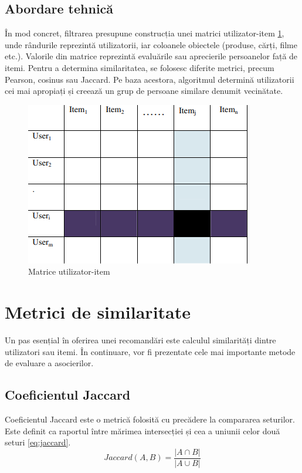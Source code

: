 \subsection{Abordare tehnică}
\label{subsec:ch3sec2sub1}
În mod concret, filtrarea presupune construcția unei matrici utilizator-item \ref{FigUserItemMatrix}, unde rândurile reprezintă utilizatorii, iar coloanele obiectele (produse, cărți, filme etc.). 
Valorile din matrice reprezintă evaluările sau aprecierile persoanelor față de itemi. Pentru a determina similaritatea, se folosesc diferite metrici, precum Pearson, cosinus sau Jaccard.
Pe baza acestora, algoritmul determină utilizatorii cei mai apropiați și creează un grup de persoane similare denumit vecinătate\cite{kumar2018recommendation}.
\begin{figure}[htbp]
	\centering
    \includegraphics[scale=1]{./figures/user-item-matrix.png}
	\caption{Matrice utilizator-item \cite{ISINKAYE2015261}}
	\label{FigUserItemMatrix}
\end{figure}


\section{Metrici de similaritate}
\label{sec:ch3sec3}
Un pas esențial în oferirea unei recomandări este calculul similarități dintre utilizatori sau itemi. 
În continuare, vor fi prezentate cele mai importante metode de evaluare a asocierilor\cite{sondur2016similarity}.

\subsection{Coeficientul Jaccard}
\label{subsec:ch3sec3sub1}
Coeficientul Jaccard \cite{bag2019efficient} este o metrică folosită cu precădere la compararea seturilor. 
Este definit ca raportul între mărimea intersecției și cea a uniunii celor două seturi \ref{eq:jaccard}.
\begin{equation}
    Jaccard(A, B) = \frac{|A \cap B|}{|A \cup B|}
    \label{eq:jaccard}
\end{equation}

